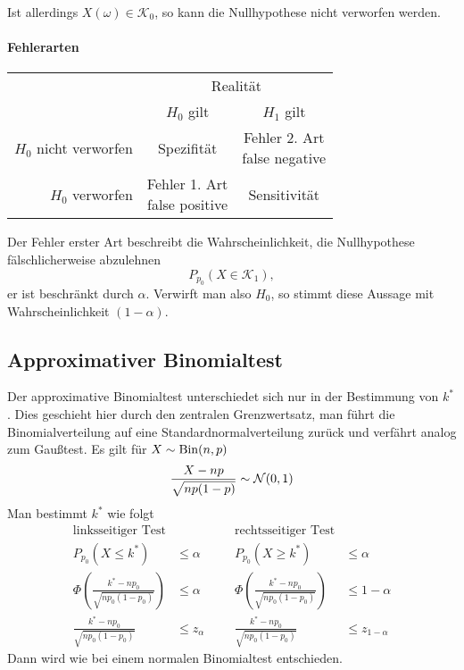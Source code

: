 Ist allerdings $X(\omega)\in\mathcal K_0$, so kann die Nullhypothese nicht verworfen werden.
\paragraph{Fehlerarten}
\begin{center}
	\begin{tabular}{r|cc}
		&\multicolumn{2}{c}{Realität}\\
		&$H_0$ gilt&$H_1$ gilt\\\hline
		$H_0$ nicht verworfen&Spezifität&\makecell{Fehler 2. Art\\ false negative}\\
		$H_0$ verworfen&\makecell{Fehler 1. Art\\ false positive}&Sensitivität
	\end{tabular}
\end{center}
Der Fehler erster Art beschreibt die Wahrscheinlichkeit, die Nullhypothese fälschlicherweise abzulehnen
\begin{equation*}
	P_{p_0}(X\in \mathcal K_1),
\end{equation*}
er ist beschränkt durch $\alpha$. Verwirft man also $H_0$, so stimmt diese Aussage mit Wahrscheinlichkeit $(1-\alpha)$.


\subsection{Approximativer Binomialtest}
Der approximative Binomialtest unterschiedet sich nur in der Bestimmung von $k^\ast$. Dies geschieht hier durch den zentralen Grenzwertsatz, man führt die Binomialverteilung auf eine Standardnormalverteilung zurück und verfährt analog zum Gaußtest. Es gilt für $X\sim\operatorname{Bin}(n,p)$
\begin{equation*}
	\frac{X-np}{\sqrt{np(1-p)}}\sim\mathcal{N}(0,1)
\end{equation*}
Man bestimmt $k^\ast$ wie folgt
\begin{align*}
	\text{linksseitiger Test}&&&&\text{rechtsseitiger Test}\\
	P_{p_0}(X\leq k^\ast)&\leq \alpha &&& P_{p_0}(X\geq k^\ast)&\leq \alpha\\
	\Phi\left(\frac{k^\ast-np_0}{\sqrt{np_0(1-p_0)}}\right)&\leq \alpha &&&\Phi\left(\frac{k^\ast-np_0}{\sqrt{np_0(1-p_0)}}\right)&\leq 1-\alpha\\
	\frac{k^\ast-np_0}{\sqrt{np_0(1-p_0)}}&\leq z_{\alpha} &&&\frac{k^\ast-np_0}{\sqrt{np_0(1-p_0)}}&\leq z_{1-\alpha}
\end{align*}
Dann wird wie bei einem normalen Binomialtest entschieden.

